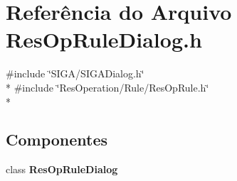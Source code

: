 \section{Referência do Arquivo Res\+Op\+Rule\+Dialog.\+h}
\label{_rule_2_res_op_rule_dialog_8h}
{\ttfamily \#include \char`\"{}S\+I\+G\+A/\+S\+I\+G\+A\+Dialog.\+h\char`\"{}}\\*
{\ttfamily \#include \char`\"{}Res\+Operation/\+Rule/\+Res\+Op\+Rule.\+h\char`\"{}}\\*
\subsection*{Componentes}
\begin{DoxyCompactItemize}
\item 
class {\bf Res\+Op\+Rule\+Dialog}
\end{DoxyCompactItemize}
